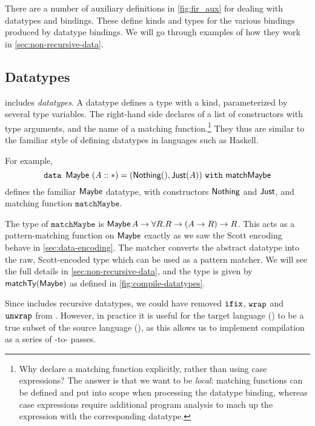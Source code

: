 There are a number of auxiliary definitions in \cref{fig:fir_aux} for dealing
with datatypes and bindings. These define kinds and types for the various
bindings produced by datatype bindings. We will go through examples of how they
work in \cref{sec:non-recursive-data}.







\subsection{Datatypes}

\FIR{} includes \emph{datatypes}. A \FIR{} datatype defines a type
with a kind, parameterized by several type variables. The right-hand side
declares of a list of constructors with type arguments, and the name
of a matching function.\footnote{Why declare a matching function explicitly,
  rather than using case expressions? The answer is that we want to be
  \emph{local}: matching functions can be defined and put into scope when
  processing the datatype binding, whereas case expressions require additional
  program analysis to mach up the expression with the corresponding datatype.}
They thus are similar to the familiar style of defining datatypes in languages such as Haskell.

For example,
\begin{displaymath}
\datatype{\Maybe}{(A :: \Type)}{\textsf{matchMaybe}}{(\Nothing (), \Just (A))}
\end{displaymath}
defines the familiar $\Maybe$ datatype, with constructors $\Nothing$ and
$\Just$, and matching function $\texttt{matchMaybe}$.

The type of $\texttt{matchMaybe}$ is $\Maybe A \rightarrow \forall R . R
\rightarrow (A \rightarrow R) \rightarrow R$. This acts as a pattern-matching
function on $\Maybe$ \textemdash{} exactly as we saw the Scott encoding behave
in \cref{sec:data-encoding}. The matcher converts the
abstract datatype into the raw, Scott-encoded type which can be used as a
pattern matcher. We will see the full details in
\cref{sec:non-recursive-data}, and the type is given by $\matchTy{\Maybe}$ as
defined in \cref{fig:compile-datatypes}.

Since \FIR{} includes recursive datatypes, we could have removed $\ifix$,
$\wrap$ and $\unwrap$ from \FIR{}. However, in practice it is useful for the
target language (\FOMF{}) to be a true subset of the source language (\FIR{}),
as this allows us to implement compilation as a series of \FIR{}-to-\FIR{} passes.

